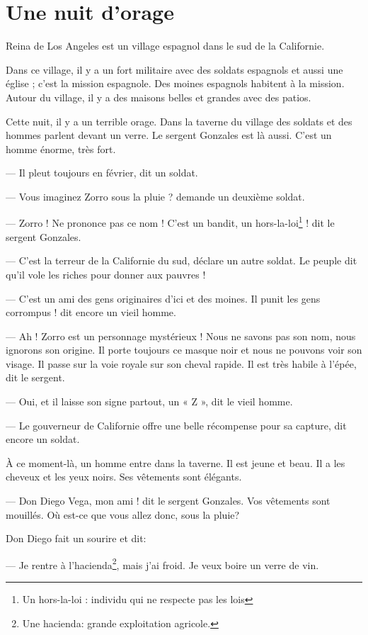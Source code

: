 \chapter{Une nuit d'orage}
Reina de Los Angeles est un village espagnol dans le sud de la Californie.

Dans ce village, il y a un fort militaire avec des soldats espagnols et aussi une église ; c'est la mission espagnole. Des moines
espagnols habitent à la mission. Autour du village, il y a des maisons belles et grandes avec des patios.

Cette nuit, il y a un terrible orage. Dans la taverne du village des soldats et des hommes parlent devant un verre. Le sergent
Gonzales est là aussi. C'est un homme énorme, très fort.

--- Il pleut toujours en février, dit un soldat.

--- Vous imaginez Zorro sous la pluie ? demande un deuxième soldat.

--- Zorro ! Ne prononce pas ce nom ! C'est un bandit, un hors-la-loi\footnote{Un hors-la-loi : individu qui ne respecte pas les
    lois} ! dit le sergent Gonzales.

--- C'est la terreur de la Californie du sud, déclare un autre soldat. Le peuple dit qu'il vole les riches pour donner aux
    pauvres !

--- C'est un ami des gens originaires d'ici et des moines. Il punit les gens corrompus ! dit encore un vieil homme.

--- Ah ! Zorro est un personnage mystérieux ! Nous ne savons pas son nom, nous ignorons son origine. Il porte toujours ce masque
    noir et nous ne pouvons voir son visage. Il passe sur la voie royale sur son cheval rapide. Il est très habile à l'épée, dit
    le sergent.

--- Oui, et il laisse son signe partout, un « Z », dit le vieil homme.

--- Le gouverneur de Californie offre une belle récompense pour sa capture, dit encore un soldat.

À ce moment-là, un homme entre dans la taverne. Il est jeune et beau. Il a les cheveux et les yeux noirs. Ses vêtements sont
élégants.

--- Don Diego Vega, mon ami ! dit le sergent Gonzales. Vos vêtements sont mouillés. Où est-ce que vous allez donc, sous la pluie?

Don Diego fait un sourire et dit:

--- Je rentre à l'hacienda\footnote{Une hacienda: grande exploitation agricole.}, mais j'ai froid. Je veux boire un verre de vin.


